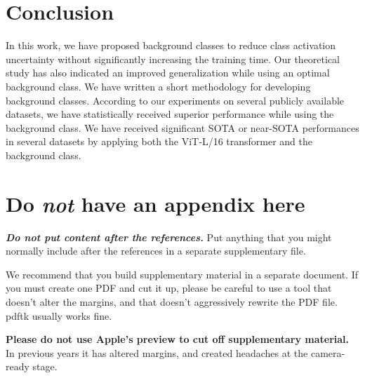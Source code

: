 \documentclass{article}
\begin{document}
\section{Conclusion}
In this work, we have proposed background classes to reduce class activation uncertainty without significantly increasing the training time. Our theoretical study has also indicated an improved generalization while using an optimal background class. We have written a short methodology for developing background classes. According to our experiments on several publicly available datasets, we have statistically received superior performance while using the background class. We have received significant SOTA or near-SOTA performances in several datasets by applying both the ViT‑L/16 transformer and the background class. 






\appendix
\section{Do \emph{not} have an appendix here}

\textbf{\emph{Do not put content after the references.}}
Put anything that you might normally include after the references in a separate
supplementary file.

We recommend that you build supplementary material in a separate document.
If you must create one PDF and cut it up, please be careful to use a tool that
doesn't alter the margins, and that doesn't aggressively rewrite the PDF file.
pdftk usually works fine. 

\textbf{Please do not use Apple's preview to cut off supplementary material.} In
previous years it has altered margins, and created headaches at the camera-ready
stage.

\fi
\end{document}
